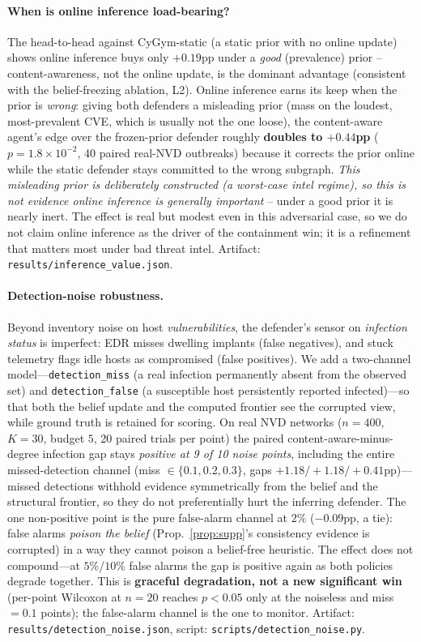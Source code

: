 \documentclass[11pt]{article}
\begin{document}
\paragraph{When is online inference load-bearing?}
The head-to-head against CyGym-static (a static prior with no online update) shows
online inference buys only $+0.19$pp under a \emph{good} (prevalence) prior --
content-awareness, not the online update, is the dominant advantage (consistent
with the belief-freezing ablation, L2). Online inference earns its keep when the
prior is \emph{wrong}: giving both defenders a misleading prior (mass on the
loudest, most-prevalent CVE, which is usually not the one loose), the
content-aware agent's edge over the frozen-prior defender roughly \textbf{doubles
to $+0.44$pp} ($p=1.8\times10^{-2}$, 40 paired real-NVD outbreaks) because it
corrects the prior online while the static defender stays committed to the wrong
subgraph. \emph{This misleading prior is deliberately constructed (a worst-case
intel regime), so this is not evidence online inference is generally important} --
under a good prior it is nearly inert. The effect is real but modest even in this
adversarial case, so we do not claim online inference as the driver of the
containment win; it is a refinement that matters most under bad threat intel.
Artifact: \texttt{results/inference\_value.json}.

\paragraph{Detection-noise robustness.}
Beyond inventory noise on host \emph{vulnerabilities}, the defender's sensor on
\emph{infection status} is imperfect: EDR misses dwelling implants (false
negatives), and stuck telemetry flags idle hosts as compromised (false
positives). We add a two-channel model---\texttt{detection\_miss} (a real
infection permanently absent from the observed set) and \texttt{detection\_false}
(a susceptible host persistently reported infected)---so that both the belief
update and the computed frontier see the corrupted view, while ground truth is
retained for scoring. On real NVD networks ($n{=}400$, $K{=}30$, budget $5$, 20
paired trials per point) the paired content-aware-minus-degree infection gap
stays \emph{positive at 9 of 10 noise points}, including the entire
missed-detection channel (miss $\in\{0.1,0.2,0.3\}$, gaps
$+1.18/+1.18/+0.41$pp)---missed detections withhold evidence symmetrically from
the belief and the structural frontier, so they do not preferentially hurt the
inferring defender. The one non-positive point is the pure false-alarm channel at
$2\%$ ($-0.09$pp, a tie): false alarms \emph{poison the belief}
(Prop.~\ref{prop:supp}'s consistency evidence is corrupted) in a way they cannot
poison a belief-free heuristic. The effect does not compound---at $5\%$/$10\%$
false alarms the gap is positive again as both policies degrade together. This is
\textbf{graceful degradation, not a new significant win} (per-point Wilcoxon at
$n{=}20$ reaches $p<0.05$ only at the noiseless and miss$=0.1$ points); the
false-alarm channel is the one to monitor. Artifact:
\texttt{results/detection\_noise.json}, script:
\texttt{scripts/detection\_noise.py}.
\end{document}
